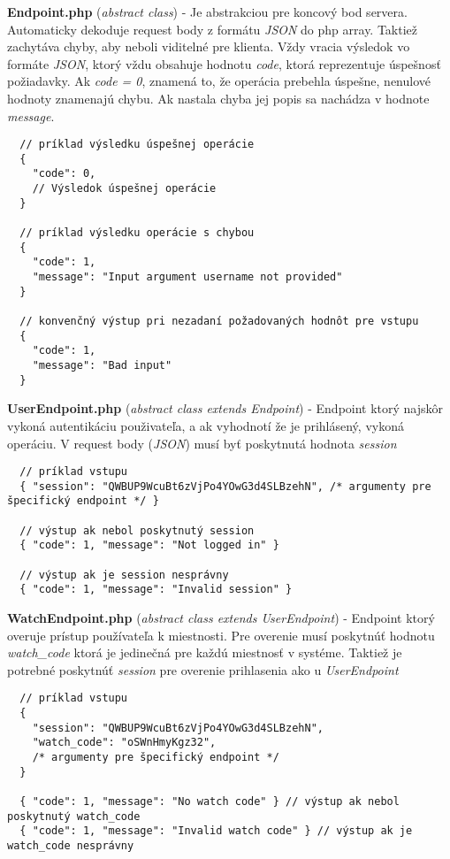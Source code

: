 \documentclass{article}
\newcommand{\filedesc}[1]{\vspace{0.3cm} \noindent \textbf{#1}}
\begin{document}
\filedesc{Endpoint.php} (\emph{abstract class}) - Je abstrakciou pre koncový bod servera. Automaticky dekoduje request body z formátu \emph{JSON} do php array. Taktiež zachytáva chyby, aby neboli viditelné pre klienta. Vždy vracia výsledok vo formáte \emph{JSON}, ktorý vždu obsahuje hodnotu \emph{code}, ktorá reprezentuje úspešnosť požiadavky. Ak \emph{code = 0}, znamená to, že operácia prebehla úspešne, nenulové hodnoty znamenajú chybu. Ak nastala chyba jej popis sa nachádza v hodnote \emph{message}.

\begin{verbatim}
  // príklad výsledku úspešnej operácie
  {
    "code": 0,
    // Výsledok úspešnej operácie 
  }

  // príklad výsledku operácie s chybou
  {
    "code": 1,
    "message": "Input argument username not provided"
  }

  // konvenčný výstup pri nezadaní požadovaných hodnôt pre vstupu
  {
    "code": 1,
    "message": "Bad input"
  }
\end{verbatim}

\filedesc{UserEndpoint.php} (\emph{abstract class extends Endpoint}) - Endpoint ktorý najskôr vykoná autentikáciu použivateľa, a ak vyhodnotí že je prihlásený, vykoná operáciu. V request body (\emph{JSON}) musí byť poskytnutá hodnota \emph{session}

\begin{verbatim}
  // príklad vstupu
  { "session": "QWBUP9WcuBt6zVjPo4YOwG3d4SLBzehN", /* argumenty pre špecifický endpoint */ }

  // výstup ak nebol poskytnutý session
  { "code": 1, "message": "Not logged in" }
  
  // výstup ak je session nesprávny
  { "code": 1, "message": "Invalid session" }
\end{verbatim}

\filedesc{WatchEndpoint.php} (\emph{abstract class extends UserEndpoint}) - Endpoint ktorý overuje prístup používateľa k miestnosti. Pre overenie musí poskytnúť hodnotu \emph{watch{\_}code} ktorá je jedinečná pre každú miestnosť v systéme. Taktiež je potrebné poskytnúť \emph{session} pre overenie prihlasenia ako u \emph{UserEndpoint}

\begin{verbatim}
  // príklad vstupu
  {
    "session": "QWBUP9WcuBt6zVjPo4YOwG3d4SLBzehN",
    "watch_code": "oSWnHmyKgz32",
    /* argumenty pre špecifický endpoint */
  }
  
  { "code": 1, "message": "No watch code" } // výstup ak nebol poskytnutý watch_code
  { "code": 1, "message": "Invalid watch code" } // výstup ak je watch_code nesprávny
  
\end{verbatim}
\end{document}
